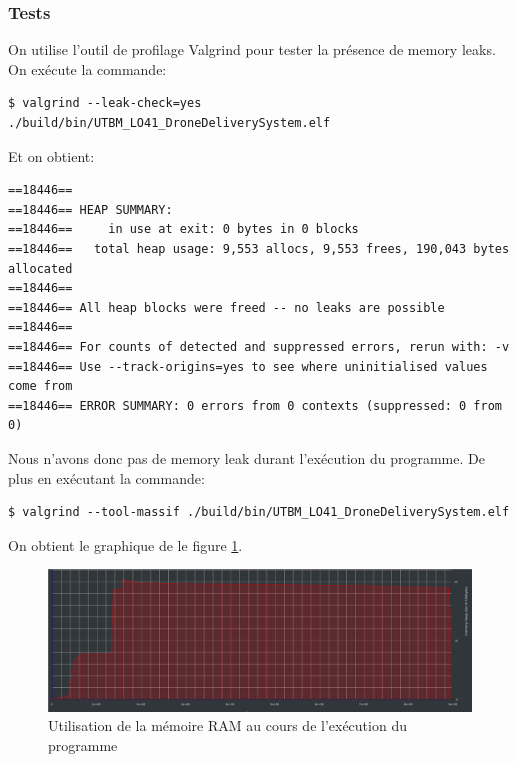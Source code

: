 \documentclass[article, backcover, french, nodocumentinfo]{upmethodology-document}
\begin{document}
			\subsubsection{Tests}
					On utilise l’outil de profilage Valgrind pour tester la présence de memory leaks.\\
					On exécute la commande:
					\begin{lstlisting}[breaklines=true,breakatwhitespace=true,breakindent=0pt,columns=fixed,keepspaces=true,frame=single,basicstyle=\footnotesize\sffamily]
$ valgrind --leak-check=yes ./build/bin/UTBM_LO41_DroneDeliverySystem.elf\end{lstlisting}
					Et on obtient:
					\begin{lstlisting}[breaklines=true,breakatwhitespace=true,breakindent=0pt,columns=fixed,keepspaces=true,frame=single,basicstyle=\footnotesize\sffamily]
==18446==
==18446== HEAP SUMMARY:
==18446==     in use at exit: 0 bytes in 0 blocks
==18446==   total heap usage: 9,553 allocs, 9,553 frees, 190,043 bytes allocated
==18446==
==18446== All heap blocks were freed -- no leaks are possible
==18446==
==18446== For counts of detected and suppressed errors, rerun with: -v
==18446== Use --track-origins=yes to see where uninitialised values come from
==18446== ERROR SUMMARY: 0 errors from 0 contexts (suppressed: 0 from 0)\end{lstlisting}
					Nous n'avons donc pas de memory leak durant l'exécution du programme.
					De plus en exécutant la commande:
					\begin{lstlisting}[breaklines=true,breakatwhitespace=true,breakindent=0pt,columns=fixed,keepspaces=true,frame=single,basicstyle=\footnotesize\sffamily]
$ valgrind --tool-massif ./build/bin/UTBM_LO41_DroneDeliverySystem.elf \end{lstlisting}
					On obtient le graphique de le figure \ref{fig:MemoryUsage}.
					\begin{figure}[H]
						\centering
						\includegraphics[width=\textwidth]{figures/memory}
						\caption{Utilisation de la mémoire RAM au cours de l'exécution du programme}
						\label{fig:MemoryUsage}
					\end{figure}
\end{document}
